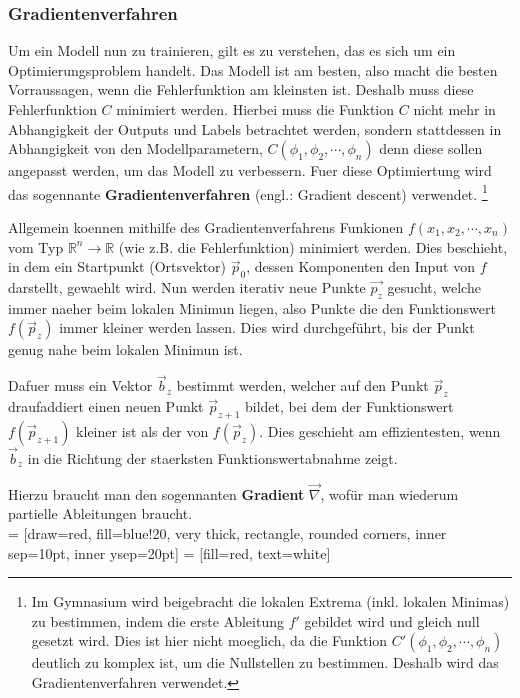 \documentclass[../main]{subfiles}
\begin{document}
\subsubsection{Gradientenverfahren}
Um ein Modell nun zu trainieren, gilt es zu verstehen, das es sich um ein Optimierungsproblem handelt.
Das Modell ist am besten, also macht die besten Vorraussagen, wenn die Fehlerfunktion am kleinsten ist.
Deshalb muss diese Fehlerfunktion $C$ minimiert werden.
Hierbei muss die Funktion $C$ nicht mehr in Abhangigkeit der Outputs und Labels betrachtet werden, sondern stattdessen in Abhangigkeit von den Modellparametern,
$C(\phi_1, \phi_2, \cdots, \phi_n)$ denn diese sollen angepasst werden, um das Modell zu verbessern.
Fuer diese Optimiertung wird das sogennante \textbf{Gradientenverfahren} (engl.: Gradient descent) verwendet.
\footnote{
    Im Gymnasium wird beigebracht die lokalen Extrema (inkl. lokalen Minimas) zu bestimmen, indem die erste Ableitung $f'$ gebildet wird und  gleich null gesetzt wird.
    Dies ist hier nicht moeglich, da die Funktion $C'(\phi_1,\phi_2, \cdots, \phi_n)$ deutlich zu komplex ist, um die Nullstellen zu bestimmen. Deshalb wird das Gradientenverfahren verwendet.
}
\par\medskip
Allgemein koennen mithilfe des Gradientenverfahrens Funkionen $f(x_1, x_2, \cdots, x_n)$ vom Typ $\mathbb{R}^n \to \mathbb{R}$ (wie z.B. die Fehlerfunktion) minimiert werden.
Dies beschieht, in dem ein Startpunkt (Ortsvektor) $\vec{p}_0$, dessen Komponenten den Input von $f$ darstellt, gewaehlt wird.
Nun werden iterativ neue Punkte $\vec{p_z}$ gesucht, welche immer naeher beim lokalen Minimun liegen, also Punkte die den Funktionswert $f(\vec{p}_z)$ immer kleiner werden lassen.
Dies wird durchgeführt, bis der Punkt genug nahe beim lokalen Minimun ist.
\par\medskip
Dafuer muss ein Vektor $\vec{b}_z$ bestimmt werden, welcher auf den Punkt $\vec{p}_z$ draufaddiert einen neuen Punkt $\vec{p}_{z+1}$ bildet,
bei dem der Funktionswert $f(\vec{p}_{z+1})$ kleiner ist als der von $f(\vec{p}_z)$.
Dies geschieht am effizientesten, wenn $\vec{b}_z$ in die Richtung der staerksten Funktionswertabnahme zeigt.

Hierzu braucht man den sogennanten \textbf{Gradient} $\vec{\nabla}$, wofür man wiederum partielle Ableitungen braucht.\\

 = [draw=red, fill=blue!20, very thick, rectangle, rounded corners, inner sep=10pt, inner ysep=20pt]
  = [fill=red, text=white]
\end{document}
